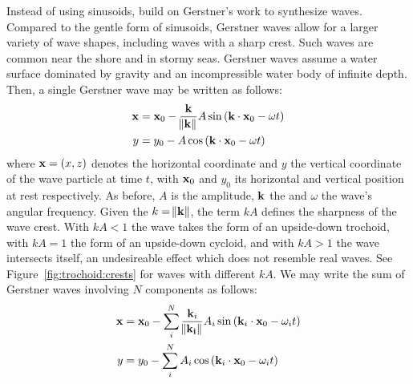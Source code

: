 \textcolor{changed}{Instead of using sinusoids,
\citet{Fournier:1986} build on Gerstner's work \citep{Gerstner:1809, Rankine:1863}
to synthesize waves. Compared to the gentle form of sinusoids, Gerstner
waves allow for a larger variety of wave shapes, including waves with a
sharp crest. Such waves are common near the shore and in stormy seas.
Gerstner waves assume a water surface dominated by gravity and an incompressible
water body of infinite depth.
} Then, a single Gerstner wave may be written as follows:
\begin{align}
\mathbf{x} &= \mathbf{x}_0 - \frac{\mathbf{k}}{\norm{\mathbf{k}}} A \sin\left(\mathbf{k}\cdot\mathbf{x}_0-\omega t\right)\\
y &= y_0 - A \cos\left(\mathbf{k}\cdot\mathbf{x}_0-\omega t\right)
\end{align}
where $\mathbf{x}=(x,z)$ denotes the horizontal coordinate and $y$ the
vertical coordinate of the wave particle at time $t$, with $\mathbf{x}_0$ and $y_0$ its horizontal
and vertical position at rest respectively. As before, $A$ is the amplitude,
$\mathbf{k}$ the \wavevector and $\omega$ the wave's angular frequency. Given the
\wavenumber $k=\norm{\mathbf{k}}$, the term $kA$ defines the sharpness of the wave
crest. With $kA<1$ the wave takes the form of an upside-down trochoid, with
$kA=1$ the form of an upside-down cycloid, and with $kA>1$ the wave intersects
itself, an undesireable effect which does not resemble real waves.
See Figure~\ref{fig:trochoid:crests} for waves with different $kA$.
We may write the sum of Gerstner waves involving $N$ components as follows:
\begin{align}
\mathbf{x} &= \mathbf{x}_0 - \sum_i^N\frac{\mathbf{k}_i}{\norm{\mathbf{k_i}}} A_i \sin\left(\mathbf{k}_i\cdot\mathbf{x}_0-\omega_i t\right)\\
y &= y_0 - \sum_i^N A_i \cos\left(\mathbf{k}_i\cdot\mathbf{x}_0-\omega_i t\right)
\end{align}
%

